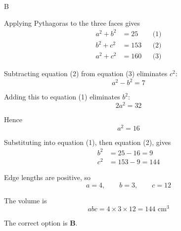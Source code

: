 \documentclass[11pt,a4paper]{article}
\begin{document}
\begin{enumerate}[label=\textbf{\arabic*.},leftmargin=*,itemsep=0pt,start=15]
\begin{djsSolution}{B}
\begin{djsSolutionFigure}
\end{djsSolutionFigure}

Applying Pythagoras to the three faces gives
\[
\begin{aligned}
a^2+b^2&=25 &&\text{(1)}\\[5pt]
b^2+c^2&=153 &&\text{(2)}\\[5pt]
a^2+c^2&=160 &&\text{(3)}
\end{aligned}
\]

Subtracting equation (2) from equation (3) eliminates $c^2$:
\[
a^2-b^2=7
\]

Adding this to equation (1) eliminates $b^2$:
\[
2a^2=32
\]

Hence
\[
a^2=16
\]

Substituting into equation (1), then equation (2), gives
\[
\begin{aligned}
b^2&=25-16=9\\[5pt]
c^2&=153-9=144
\end{aligned}
\]

Edge lengths are positive, so
\[
a=4,\qquad b=3,\qquad c=12
\]

The volume is
\[
abc=4\times3\times12=144\text{ cm}^3
\]

The correct option is \textbf{B}.
\end{djsSolution}
\end{enumerate}
\clearpage
\thispagestyle{djssolutions}
\vspace*{8pt}
\end{document}
